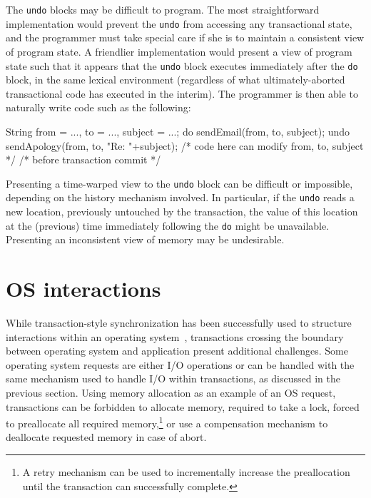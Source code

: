 The \texttt{undo} blocks may be difficult to program.  The most
straightforward implementation would prevent the \texttt{undo} from
accessing any transactional state, and the programmer must take
special care if she is to maintain a consistent view of program state.
A friendlier implementation would present a view of program state such
that it appears that the \texttt{undo} block executes immediately
after the \texttt{do} block, in the same lexical environment
(regardless of what ultimately-aborted transactional code has executed
in the interim).  The programmer is then able to naturally write code
such as the following:
\begin{inlinecode}
String from = ..., to = ..., subject = ...;
do {
  sendEmail(from, to, subject);
} undo {
  sendApology(from, to, "Re: "+subject);
}
/* code here can modify from, to, subject */
/* before transaction commit */
\end{inlinecode}

Presenting a time-warped view to the \texttt{undo} block can be
difficult or impossible, depending on the history mechanism involved.
In particular, if the \texttt{undo} reads a new location, previously
untouched by the transaction, the value of this location at the
(previous) time immediately following the \texttt{do} might be
unavailable.  Presenting an inconsistent view of memory may be
undesirable.

\section{OS interactions}
While transaction-style synchronization has been successfully used to
structure interactions within an operating system~\cite{MassalinPu91},
transactions crossing the boundary between operating system and
application present additional challenges.  Some operating system
requests are either I/O operations or can be handled with the same
mechanism used to handle I/O within transactions, as discussed in the
previous section.  Using memory allocation as an example of an OS
request, transactions can be forbidden to allocate memory, required to
take a lock, forced to preallocate all required memory,\footnote{A
retry mechanism can be used to incrementally increase the
preallocation until the transaction can successfully complete.} or
use a compensation mechanism to deallocate requested memory in case of
abort.

